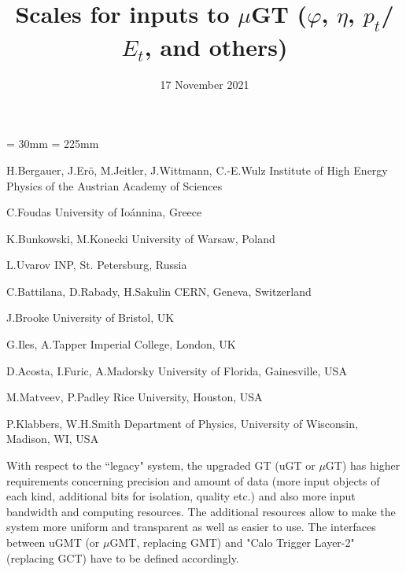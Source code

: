 \documentclass{cmspaper}
\begin{document}
\topmargin = 30mm
\textheight = 225mm

\def\detectornote#1{{Available on CMS information server
\hfill\Large\bf CMS DN #1}
\begin{center}\texttt{[image: cms\_dn.eps]}\end{center}}

\begin{titlepage}

\date{17 November 2021}
\title{Scales for inputs to $\mu$GT
($\varphi$, $\eta$, $p_t$/$E_t$, and others)}

\begin{Authlist}
{H.Bergauer, J.Er\"{o}, M.Jeitler,
J.Wittmann, C.-E.Wulz}
{Institute of High Energy Physics of the Austrian Academy of Sciences}

C.Foudas
{University of Io\'annina, Greece}

K.Bunkowski, M.Konecki
{University of Warsaw, Poland}

L.Uvarov
{INP, St. Petersburg, Russia}

C.Battilana, D.Rabady, H.Sakulin
{CERN, Geneva, Switzerland}

J.Brooke
{University of Bristol, UK}

G.Iles, A.Tapper
{Imperial College, London, UK}


D.Acosta, I.Furic, A.Madorsky
{University of Florida, Gainesville, USA}

M.Matveev, P.Padley
{Rice University, Houston, USA}

P.Klabbers, W.H.Smith
{Department of Physics, University of Wisconsin, Madison, WI, USA }

\end{Authlist}

\end{titlepage}

With respect to the ``legacy" system, the upgraded GT (uGT or $\mu$GT) has higher requirements concerning precision and amount of data (more input objects of each kind, additional bits for isolation, quality etc.) and also more input bandwidth and computing resources. The additional resources  allow to make the system more uniform and transparent as well as easier to use. The interfaces between uGMT (or $\mu$GMT, replacing GMT) and "Calo Trigger Layer-2" (replacing GCT) have to be defined accordingly.
\end{document}
